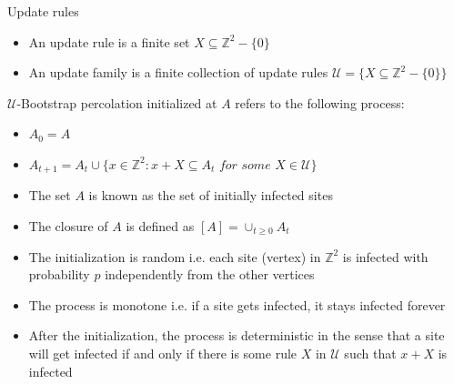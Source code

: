 \begin{frame}{Update rules}
    
    \begin{itemize}
        \item An update rule is a finite set $X\subseteq\mathbb{Z}^2-\{0\}$
        \item An update family is a finite collection of update rules $\mathcal{U}=\{X\subseteq\mathbb{Z}^2-\{0\}\}$
    \end{itemize}
    
 
\begin{block}{}
   
 $\mathcal{U}$-Bootstrap percolation initialized at $A$ refers to the following process:

 \begin{itemize}
     \item $A_0=A$
     \item $A_{t+1}=A_t\cup \{x\in\mathbb{Z}^2: x+X\subseteq A_t \textit{ for some } X\in\mathcal{U}\}$
 \end{itemize}
 \end{block}
 
 \end{frame}
 \begin{frame}

 \begin{itemize}
 
 
     \item The set $A$ is known as the set of initially infected sites
     \item The closure of $A$ is defined as $[A]=\cup_{t\geq 0} A_t$
     \item The initialization is random i.e. each site (vertex)
     in $\mathbb{Z}^2$ is infected with probability $p$ independently from the other vertices
     \item The process is monotone i.e. if a site gets infected, it stays infected forever
     \item After the initialization, the process is deterministic in the sense that a site will get infected if and only if there is some rule $X$ in $\mathcal{U}$ such that $x+X$ is infected
 \end{itemize}
 


\end{frame}




